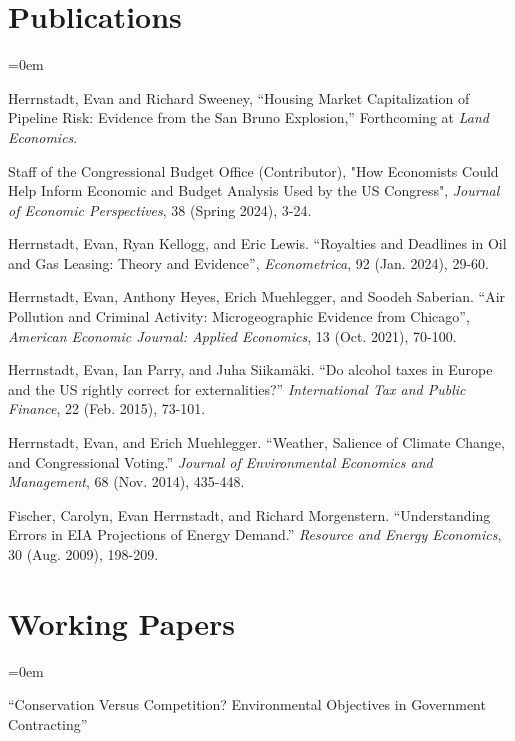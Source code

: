 \documentclass[letterpaper]{article}
\renewenvironment{itemize}{
  \vspace{-0.5em}
  \begin{list}{}{
	\itemsep=0em
    \setlength{\leftmargin}{1.5em}
  }
}{
  \end{list}
}
\begin{document}
\section*{Publications}

\begin{itemize}
\item Herrnstadt, Evan and Richard Sweeney, “Housing Market Capitalization of Pipeline Risk: Evidence from the San Bruno Explosion,” Forthcoming at \emph{Land Economics}.

\item Staff of the Congressional Budget Office (Contributor), "How Economists Could Help Inform Economic and Budget Analysis Used by the US Congress", 
\textit{Journal of Economic Perspectives}, 38 (Spring 2024), 3-24.
	
\item Herrnstadt, Evan, Ryan Kellogg, and Eric Lewis. “Royalties and Deadlines in Oil and Gas Leasing: Theory and Evidence”, \textit{Econometrica}, 92 (Jan. 2024), 29-60.

\item Herrnstadt, Evan, Anthony Heyes, Erich Muehlegger, and Soodeh Saberian. “Air Pollution and Criminal Activity: Microgeographic Evidence from Chicago”, \textit{American Economic Journal: Applied Economics}, 13 (Oct. 2021), 70-100.

\item Herrnstadt, Evan, Ian Parry, and Juha Siikamäki. “Do alcohol taxes in Europe and the US rightly correct for externalities?” \textit{International Tax and Public Finance}, 22 (Feb. 2015), 73-101.

\item Herrnstadt, Evan, and Erich Muehlegger.  “Weather, Salience of Climate Change, and Congressional Voting.” \textit{Journal of Environmental Economics and Management}, 68 (Nov. 2014), 435-448.

\item Fischer, Carolyn, Evan Herrnstadt, and Richard Morgenstern. “Understanding Errors in EIA Projections of Energy Demand.”  \textit{Resource and Energy Economics}, 30 (Aug. 2009), 198-209.
\end{itemize}

\section*{Working Papers}

\begin{itemize}
\item “Conservation Versus Competition? Environmental Objectives in Government Contracting” 

\end{itemize}
\end{document}
